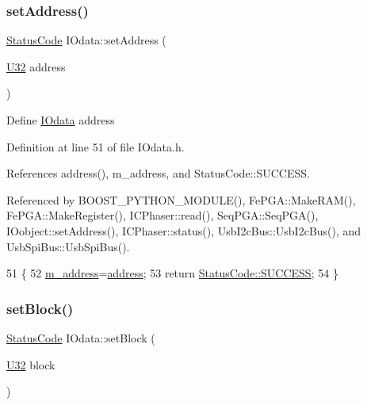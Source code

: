 \subsubsection{\texorpdfstring{set\+Address()}{setAddress()}}
{\footnotesize\ttfamily \hyperlink{classStatusCode}{Status\+Code} I\+Odata\+::set\+Address (\begin{DoxyParamCaption}\item[{\hyperlink{classIOdata_a96fb57f5fcd87b708743abd3c86a5198}{U32}}]{address }\end{DoxyParamCaption})\hspace{0.3cm}{\ttfamily [inline]}}

Define \hyperlink{classIOdata}{I\+Odata} address 

Definition at line 51 of file I\+Odata.\+h.



References address(), m\+\_\+address, and Status\+Code\+::\+S\+U\+C\+C\+E\+SS.



Referenced by B\+O\+O\+S\+T\+\_\+\+P\+Y\+T\+H\+O\+N\+\_\+\+M\+O\+D\+U\+L\+E(), Fe\+P\+G\+A\+::\+Make\+R\+A\+M(), Fe\+P\+G\+A\+::\+Make\+Register(), I\+C\+Phaser\+::read(), Seq\+P\+G\+A\+::\+Seq\+P\+G\+A(), I\+Oobject\+::set\+Address(), I\+C\+Phaser\+::status(), Usb\+I2c\+Bus\+::\+Usb\+I2c\+Bus(), and Usb\+Spi\+Bus\+::\+Usb\+Spi\+Bus().


\begin{DoxyCode}
51                                     \{
52     \hyperlink{classIOdata_a965810e1888b904c575277f50cea734a}{m\_address}=\hyperlink{classIOdata_afe410c86881b8c2082a08e5ce9843306}{address};
53     \textcolor{keywordflow}{return} \hyperlink{classStatusCode_a6f565cbeadc76d14c72f047e5e85eb4badd0da38d3ba0d922efd1f4619bc37ad8}{StatusCode::SUCCESS};
54   \}
\end{DoxyCode}
\mbox{\label{classIOdata_a334f07d85e3dc8069551dcd8ab942e9c}} 
\subsubsection{\texorpdfstring{set\+Block()}{setBlock()}}
{\footnotesize\ttfamily \hyperlink{classStatusCode}{Status\+Code} I\+Odata\+::set\+Block (\begin{DoxyParamCaption}\item[{\hyperlink{classIOdata_a96fb57f5fcd87b708743abd3c86a5198}{U32}}]{block }\end{DoxyParamCaption})\hspace{0.3cm}{\ttfamily [inline]}}


